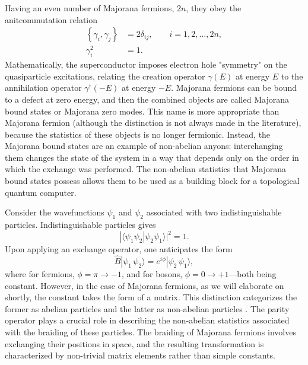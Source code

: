 \documentclass{article}
\begin{document}
Having an even number of Majorana fermions, $ 2n $, they obey the anitcommutation relation
\begin{equation}
	\begin{aligned}
		\left\{\gamma_i, \gamma_j\right\} & = 2 \delta_{i j}, \qquad i=1, 2, \dots, 2n  , \\
		\gamma_i^2                        & = 1.
	\end{aligned}
\end{equation}
Mathematically, the superconductor imposes electron hole "symmetry" on the quasiparticle excitations, relating the creation operator $\gamma(E)$ at energy $E$ to the annihilation operator $\gamma^{\dagger}(-E)$ at energy $-E$.\cite{Majorana-returns} Majorana fermions can be bound to a defect at zero energy, and then the combined objects are called Majorana bound states or Majorana zero modes. This name is more appropriate than Majorana fermion (although the distinction is not always made in the literature), because the statistics of these objects is no longer fermionic. Instead, the Majorana bound states are an example of non-abelian anyons: interchanging them changes the state of the system in a way that depends only on the order in which the exchange was performed. The non-abelian statistics that Majorana bound states possess allows them to be used as a building block for a topological quantum computer.

Consider the wavefunctions $ \psi_1 $ and $ \psi_2 $ associated with two indistinguishable particles. Indistinguishable particles gives
\[
	| \langle \psi_1 \psi_2 | \psi_2 \psi_1 \rangle |^2 = 1 .
\]
Upon applying an exchange operator, one anticipates the form
\begin{equation}
	\hat{B} | \psi_1\, \psi_2 \rangle = e^{i\phi} | \psi_2\, \psi_1 \rangle,
\end{equation}
where for fermions, $ \phi = \pi \rightarrow -1 $, and for bosons, $ \phi = 0 \rightarrow +1 $—both being constant. However, in the case of Majorana fermions, as we will elaborate on shortly, the constant takes the form of a matrix. This distinction categorizes the former as abelian particles and the latter as non-abelian particles \cite{Nayak_2008}. The parity operator plays a crucial role in describing the non-abelian statistics associated with the braiding of these particles. The braiding of Majorana fermions involves exchanging their positions in space, and the resulting transformation is characterized by non-trivial matrix elements rather than simple constants.
\end{document}
